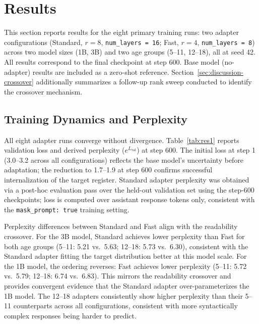 \documentclass[journal]{IEEEtai}
\begin{document}
\section{Results}

This section reports results for the eight primary training runs: two adapter configurations (Standard, $r = 8$, \texttt{num\_layers = 16}; Fast, $r = 4$, \texttt{num\_layers = 8}) across two model sizes (1B, 3B) and two age groups (5--11, 12--18), all at seed 42. All results correspond to the final checkpoint at step 600. Base model (no-adapter) results are included as a zero-shot reference. Section~\ref{sec:discussion-crossover} additionally summarizes a follow-up rank sweep conducted to identify the crossover mechanism.

\subsection{Training Dynamics and Perplexity}

All eight adapter runs converge without divergence. Table~\ref{tab:res1} reports validation loss and derived perplexity ($e^{L_{\text{val}}}$) at step 600. The initial loss at step 1 (3.0--3.2 across all configurations) reflects the base model's uncertainty before adaptation; the reduction to 1.7--1.9 at step 600 confirms successful internalization of the target register. Standard adapter perplexity was obtained via a post-hoc evaluation pass over the held-out validation set using the step-600 checkpoints; loss is computed over assistant response tokens only, consistent with the \texttt{mask\_prompt: true} training setting.

Perplexity differences between Standard and Fast align with the readability crossover. For the 3B model, Standard achieves lower perplexity than Fast for both age groups (5--11: 5.21 vs.\ 5.63; 12--18: 5.73 vs.\ 6.30), consistent with the Standard adapter fitting the target distribution better at this model scale. For the 1B model, the ordering reverses: Fast achieves lower perplexity (5--11: 5.72 vs.\ 5.79; 12--18: 6.74 vs.\ 6.83). This mirrors the readability crossover and provides convergent evidence that the Standard adapter over-parameterizes the 1B model. The 12--18 adapters consistently show higher perplexity than their 5--11 counterparts across all configurations, consistent with more syntactically complex responses being harder to predict.
\end{document}
